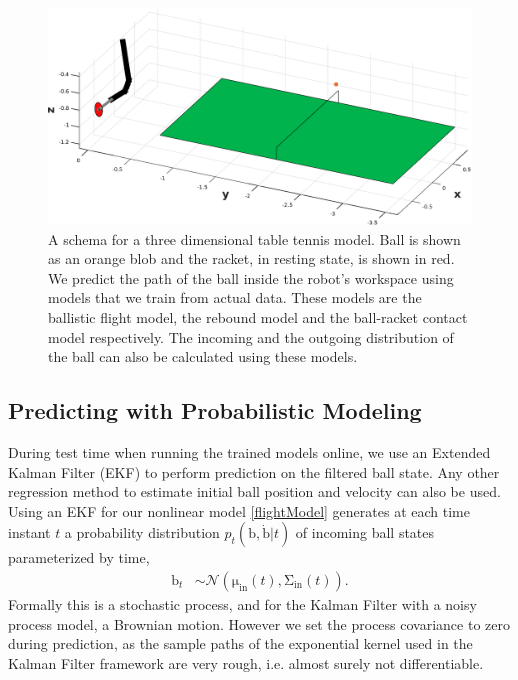 \documentclass[letterpaper, 10 pt, conference]{ieeeconf}
\newcommand{\boldvec}[1]{\boldsymbol{\mathrm{#1}}}
\let\vec\boldvec
\newcommand{\ball}{\vec{b}} %
\begin{document}
\begin{figure}[t!]
\centering
\includegraphics[scale=0.25]{tableTennis3D.eps}			
\caption{A schema for a three dimensional table tennis model. Ball is shown as an orange blob and the racket, in resting state, is shown in red. We predict the path of the ball inside the robot's workspace using models that we train from actual data. These models are the ballistic flight model, the rebound model and the ball-racket contact model respectively. The incoming and the outgoing distribution of the ball can also be calculated using these models.}
\label{models}
\end{figure}

\subsection{Predicting with Probabilistic Modeling}\label{sectionPredict}
 
During test time when running the trained models online, we use an Extended Kalman Filter (EKF) to perform prediction on the filtered ball state. Any other regression method to estimate initial ball position and velocity can also be used.
Using an EKF for our nonlinear model \eqref{flightModel} generates at each time instant $t$ a probability distribution $p_t(\ball,\dot{\ball}|t)$ of incoming ball states parameterized by time, 
%
\begin{align}
\ball_t &\sim \mathcal{N}(\vec{\mu}_{\textrm{in}}(t),\vec{\Sigma}_{\textrm{in}}(t)). 
\label{ballProcess}
\end{align}
%
%
\noindent Formally this is a stochastic process, and for the Kalman Filter with a noisy process model, a Brownian motion. However we set the process covariance to zero during prediction, as the sample paths of the exponential kernel used in the Kalman Filter framework are very rough, i.e. almost surely not differentiable.
\end{document}
